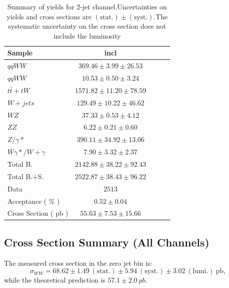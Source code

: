 \begin{table}[!ht]
{\small
\begin{center}
\begin{tabular}{|l|c|c|c|c|}
\hline
Sample	& incl	\\ \hline
$qqWW$	& $369.46 \pm 3.99 \pm 26.53 $	\\ 
$qqWW$	& $10.53 \pm 0.50 \pm 3.24 $	\\ 
$t\bar{t} + tW$	& $1571.82 \pm 11.20 \pm 78.59 $	\\ 
$W+jets$	& $129.49 \pm 10.22 \pm 46.62 $	\\ 
$WZ$	& $37.33 \pm 0.53 \pm 4.12 $	\\ 
$ZZ$	& $6.22 \pm 0.21 \pm 0.60 $	\\ 
$Z/\gamma*$	& $390.11 \pm 34.92 \pm 13.06 $	\\ 
$W\gamma*/W+\gamma$	& $7.90 \pm 3.32 \pm 2.37 $	\\ 
\hline \hline 
Total B.	& $2142.88 \pm 38.22 \pm 92.43 $	\\ \hline \hline 
Total B.+S.	& $2522.87 \pm 38.43 \pm 96.22 $	\\ \hline \hline
Data	& $2513$ 	\\ \hline \hline
Acceptance ( \% )	& $0.52 \pm 0.04 	$\\ 
Cross Section ( pb )	& $55.63 \pm 7.53 \pm 15.66$ 	\\ \hline
\end{tabular}
\caption{Summary of yields for 2-jet channel.Uncertainties on yields and cross sections are $\mathrm{(stat.)} \pm \mathrm{(syst.)}$.The systematic uncertainty on the cross section does not include the luminosity}
\label{tab:datayields_wwxsec_2j}
\end{center}}
\end{table}
\clearpage
\subsection{Cross Section Summary (All Channels)}

The measured cross section in the zero jet bin is:
\begin{equation}
\sigma_{WW}  = 68.62 \pm 1.49~\mathrm{(stat.)} \pm 5.94~\mathrm{(syst.)} \pm 3.02~\mathrm{(lumi.)~pb}, 
\end{equation}
while the theoretical prediction is $57.1\pm 2.0~pb$. 

